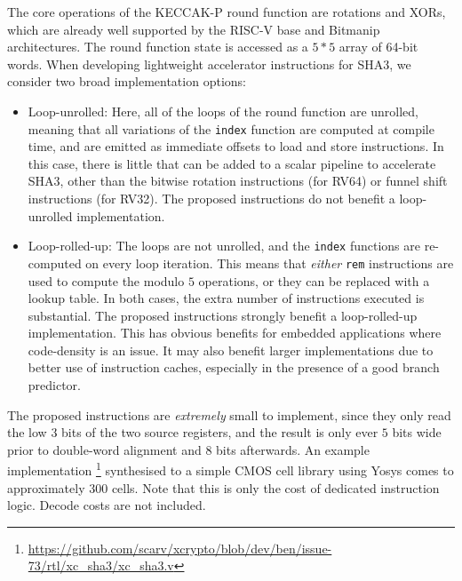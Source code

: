 The core operations of the KECCAK-P round function are rotations
and XORs, which are already well supported by the RISC-V
base and Bitmanip architectures.
The round function state is accessed as a $5*5$ array of
64-bit words.
When developing lightweight accelerator instructions for SHA3, we
consider two broad implementation options:

\begin{itemize}
\item Loop-unrolled: Here, all of the loops of the round function are
    unrolled, meaning that all variations of the \lstinline{index}
    function are computed at compile time, and are emitted as immediate
    offsets to load and store instructions.
    In this case, there is little that can be added to a scalar
    pipeline to accelerate SHA3, other than the bitwise rotation instructions
    (for RV64) or funnel shift instructions (for RV32).
    The proposed instructions do not benefit a loop-unrolled implementation.
\item Loop-rolled-up: The loops are not unrolled, and the
    \lstinline{index} functions are re-computed on every loop iteration.
    This means that {\em either} {\tt rem} instructions are used to
    compute the modulo $5$ operations, or they can be replaced with a
    lookup table.
    In both cases, the extra number of instructions executed is
    substantial.
    The proposed instructions strongly benefit a loop-rolled-up
    implementation.
    This has obvious benefits for embedded applications where code-density
    is an issue.
    It may also benefit larger implementations due to better use of
    instruction caches, especially in the presence of a good branch
    predictor.
\end{itemize}

The proposed instructions are {\em extremely} small to implement, since
they only read the low $3$ bits of the two source registers, and
the result is only ever $5$ bits wide prior to double-word alignment and
$8$ bits afterwards.
An example implementation
\footnote{\url{https://github.com/scarv/xcrypto/blob/dev/ben/issue-73/rtl/xc_sha3/xc_sha3.v}}
synthesised to a simple CMOS cell library using Yosys comes to
approximately $300$ cells.
Note that this is only the cost of dedicated instruction logic.
Decode costs are not included.

